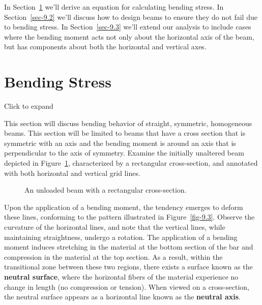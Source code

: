 \documentclass[
  letterpaper,
  DIV=11,
  numbers=noendperiod]{scrreprt}
\theoremstyle{definition}
\theoremstyle{remark}
\begin{document}
In Section~\ref{sec-9.1} we'll derive an equation for calculating
bending stress. In Section~\ref{sec-9.2} we'll discuss how to design
beams to ensure they do not fail due to bending stress. In
Section~\ref{sec-9.3} we'll extend our analysis to include cases where
the bending moment acts not only about the horizontal axis of the beam,
but has components about both the horizontal and vertical axes.

\section{Bending Stress}\label{sec-9.1}

Click to expand

This section will discuss bending behavior of straight, symmetric,
homogeneous beams. This section will be limited to beams that have a
cross section that is symmetric with an axis and the bending moment is
around an axis that is perpendicular to the axis of symmetry. Examine
the initially unaltered beam depicted in Figure~\ref{fig-9.2},
characterized by a rectangular cross-section, and annotated with both
horizontal and vertical grid lines.

\begin{figure}


\caption{\label{fig-9.2}An unloaded beam with a rectangular
cross-section.}

\end{figure}%

Upon the application of a bending moment, the tendency emerges to deform
these lines, conforming to the pattern illustrated in
Figure~\ref{fig-9.3}. Observe the curvature of the horizontal lines, and
note that the vertical lines, while maintaining straightness, undergo a
rotation. The application of a bending moment induces stretching in the
material at the bottom section of the bar and compression in the
material at the top section. As a result, within the transitional zone
between these two regions, there exists a surface known as the
\textbf{neutral surface}, where the horizontal fibers of the material
experience no change in length (no compression or tension). When viewed
on a cross-section, the neutral surface appears as a horizontal line
known as the \textbf{neutral axis}.
\end{document}
